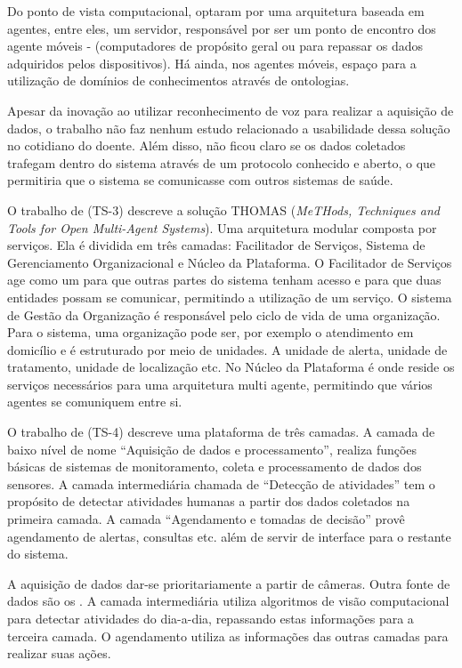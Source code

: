 Do ponto de vista computacional,  optaram
por uma arquitetura baseada em agentes, entre eles, um servidor, responsável por ser
um ponto de encontro dos agente móveis - (computadores de propósito geral ou
\smartphones[] para repassar os dados adquiridos pelos dispositivos). Há ainda,
nos agentes móveis, espaço para a utilização de domínios de conhecimentos
através de ontologias.
 
Apesar da inovação ao utilizar reconhecimento de voz para realizar a aquisição
de dados, o trabalho não faz nenhum estudo relacionado a usabilidade dessa
solução no cotidiano do doente. Além disso, não ficou claro se os dados
coletados trafegam dentro do sistema através de um protocolo conhecido e
aberto, o que permitiria que o sistema se comunicasse com outros sistemas de saúde.

O trabalho de  (TS-3) descreve a solução THOMAS
(\textit{MeTHods, Techniques and Tools for Open Multi-Agent Systems}). Uma
arquitetura modular composta por serviços. Ela é dividida em três camadas:
Facilitador de Serviços, Sistema de Gerenciamento Organizacional e Núcleo
da Plataforma. O Facilitador de Serviços age como um \gateway[] para que outras
partes do sistema tenham acesso e para que duas entidades possam se comunicar,
permitindo a utilização de um serviço. O sistema de Gestão da Organização é
responsável pelo ciclo de vida de uma organização. Para o sistema, uma
organização pode ser, por exemplo o atendimento em domicílio e é estruturado por meio de
unidades. A unidade de alerta, unidade de tratamento, unidade de
localização  etc. No Núcleo da Plataforma é onde reside os serviços necessários
para uma arquitetura multi agente, permitindo que vários agentes se comuniquem
entre si.

O trabalho de  (TS-4) descreve uma plataforma de três
camadas. A camada de baixo nível de nome ``Aquisição de dados e
processamento'', realiza funções básicas de sistemas de monitoramento, coleta e
processamento de dados dos sensores. A camada intermediária chamada de
``Detecção de atividades'' tem o propósito de detectar atividades humanas a
partir dos dados coletados na primeira camada. A camada ``Agendamento e tomadas
de decisão'' provê agendamento de alertas, consultas etc.  além de servir de
interface para o restante do sistema.

A aquisição de dados dar-se prioritariamente a partir de câmeras.  Outra fonte
de dados são os \smartphones.  A camada intermediária utiliza algoritmos de
visão computacional para detectar atividades do dia-a-dia, repassando estas
informações para a terceira camada. O agendamento utiliza as informações das
outras camadas para realizar suas ações. 


